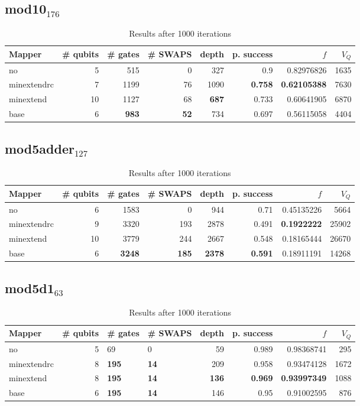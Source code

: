 \documentclass[11pt]{article}
\begin{document}
\subsection{mod10\(_{\text{176}}\)}
\label{sec:org8484897}
\begin{table}[H]
\caption{\label{tab:org0f8b58d}
Results after 1000 iterations}
\centering
\small
\begin{tabular}{lrrrrrrr}
\hline
Mapper & \# qubits & \# gates & \# SWAPS & depth & p. success & \(f\) & \(V_Q\)\\
\hline
no & 5 & 515 & 0 & 327 & 0.9 & 0.82976826 & 1635\\
\hline
minextendrc & 7 & 1199 & 76 & 1090 & \textbf{0.758} & \textbf{0.62105388} & 7630\\
minextend & 10 & 1127 & 68 & \textbf{687} & 0.733 & 0.60641905 & 6870\\
base & 6 & \textbf{983} & \textbf{52} & 734 & 0.697 & 0.56115058 & 4404\\
\hline
\end{tabular}
\end{table}
\subsection{mod5adder\(_{\text{127}}\)}
\label{sec:org33d8341}
\begin{table}[H]
\caption{\label{tab:org807c966}
Results after 1000 iterations}
\centering
\small
\begin{tabular}{lrrrrrrr}
\hline
Mapper & \# qubits & \# gates & \# SWAPS & depth & p. success & \(f\) & \(V_Q\)\\
\hline
no & 6 & 1583 & 0 & 944 & 0.71 & 0.45135226 & 5664\\
\hline
minextendrc & 9 & 3320 & 193 & 2878 & 0.491 & \textbf{0.1922222} & 25902\\
minextend & 10 & 3779 & 244 & 2667 & 0.548 & 0.18165444 & 26670\\
base & 6 & \textbf{3248} & \textbf{185} & \textbf{2378} & \textbf{0.591} & 0.18911191 & 14268\\
\hline
\end{tabular}
\end{table}
\subsection{mod5d1\(_{\text{63}}\)}
\label{sec:orga7cb8fd}
\begin{table}[H]
\caption{\label{tab:org82048fa}
Results after 1000 iterations}
\centering
\small
\begin{tabular}{lrllrrrr}
\hline
Mapper & \# qubits & \# gates & \# SWAPS & depth & p. success & \(f\) & \(V_Q\)\\
\hline
no & 5 & 69 & 0 & 59 & 0.989 & 0.98368741 & 295\\
\hline
minextendrc & 8 & \textbf{195} & \textbf{14} & 209 & 0.958 & 0.93474128 & 1672\\
minextend & 8 & \textbf{195} & \textbf{14} & \textbf{136} & \textbf{0.969} & \textbf{0.93997349} & 1088\\
base & 6 & \textbf{195} & \textbf{14} & 146 & 0.95 & 0.91002595 & 876\\
\hline
\end{tabular}
\end{table}
\end{document}
